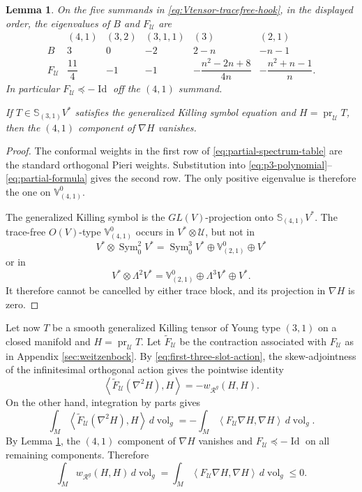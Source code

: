 \documentclass[reqno,11pt]{amsart}
\newtheorem{lemma}[theorem]{Lemma}
\theoremstyle{definition}
\newcommand{\Rop}{\mathscr R}
\newcommand{\Sym}{\operatorname{Sym}}
\newcommand{\Id}{\operatorname{Id}}
\newcommand{\vol}{\operatorname{vol}}
\newcommand{\cU}{\mathcal U}
\newcommand{\Hook}{\mathbb S_{(3,1)}}
\newcommand{\inner}[2]{\left\langle #1,#2\right\rangle}
\begin{document}
\begin{lemma}\label{lem:first-three-slot-spectrum}
On the five summands in \eqref{eq:Vtensor-tracefree-hook}, in the displayed
order, the eigenvalues of $B$ and $F_{\cU}$ are
\begin{equation}\label{eq:partial-spectrum-table}
\begin{array}{c|ccccc}
 & (4,1)&(3,2)&(3,1,1)&(3)&(2,1)\\ \hline
 B&3&0&-2&2-n&-n-1\\[2pt]
 F_{\cU}&\dfrac{11}{4}&-1&-1&
 -\dfrac{n^2-2n+8}{4n}&-\dfrac{n^2+n-1}{n}.
\end{array}
\end{equation}
In particular $F_{\cU}\preceq-\Id$ off the $(4,1)$ summand.

If $T\in\Hook V^*$ satisfies the generalized Killing symbol
equation and $H=\operatorname{pr}_{\cU}T$, then the $(4,1)$ component of $\nabla H$ vanishes.
\end{lemma}

\begin{proof}
The conformal weights in the first row of
\eqref{eq:partial-spectrum-table} are the standard orthogonal Pieri weights.
Substitution into \eqref{eq:p3-polynomial}--\eqref{eq:partial-formula}
gives the second row.  The only positive eigenvalue is therefore the one on
$\mathbb V^0_{(4,1)}$.

The generalized Killing symbol is the $GL(V)$-projection onto
$\mathbb S_{(4,1)}V^*$.  The trace-free $O(V)$-type
$\mathbb V^0_{(4,1)}$ occurs in $V^*\otimes\cU$, but not in
$$
 V^*\otimes\Sym^2_0V^*
 =\Sym^3_0V^*\oplus\mathbb V^0_{(2,1)}\oplus V^*
$$
or in
$$
 V^*\otimes\Lambda^2V^*
 =\mathbb V^0_{(2,1)}\oplus\Lambda^3V^*\oplus V^*.
$$
It therefore cannot be cancelled by either trace block, and its projection
in $\nabla H$ is zero.\end{proof}

Let now $T$ be a smooth generalized Killing tensor of Young type $(3,1)$ on a closed manifold and
$H=\operatorname{pr}_{\cU}T$. Let $\widetilde F_{\cU}$ be the contraction associated with
$F_{\cU}$ as in Appendix \ref{sec:weitzenbock}. By
\eqref{eq:first-three-slot-action}, the skew-adjointness of the infinitesimal
orthogonal action gives the pointwise identity
\begin{equation*}
  \inner{\widetilde F_{\cU}(\nabla^2H)}{H}
  =-w_{\Rop^g}(H,H).
\end{equation*}
On the other hand, integration by parts gives
$$
  \int_M\inner{\widetilde F_{\cU}(\nabla^2H)}{H}\,d\vol_g
  =-\int_M\inner{F_{\cU}\nabla H}{\nabla H}\,d\vol_g.
$$
By Lemma \ref{lem:first-three-slot-spectrum}, the $(4,1)$ component of $\nabla H$ vanishes
and $F_{\cU}\preceq-\Id$ on all remaining components. Therefore
\begin{equation}\label{eq:partial-integral-sign}
  \int_M w_{\Rop^g}(H,H)\,d\vol_g
  =\int_M\inner{F_{\cU}\nabla H}{\nabla H}\,d\vol_g
  \leq0.
\end{equation}
\end{document}
